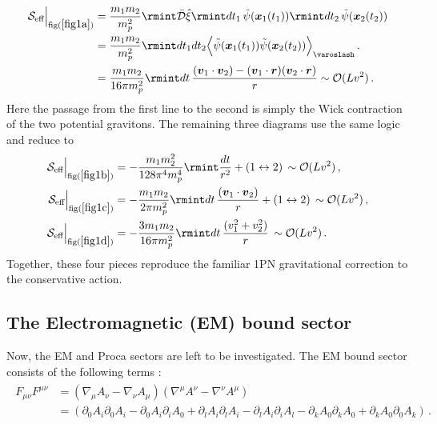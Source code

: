 \begin{align}
    \begin{split}
   \mathcal{S}_{\text{eff}}\Big|_{\text{fig}(\ref{fig1a})}& =\frac{m_1 m_2}{m_p^2}\rmint \Bar{\mathcal{D}}\hat\xi\rmint dt_1\,\tilde{\psi}(\boldsymbol{x}_1
    (t_1))\rmint dt_2\,\tilde{\psi}(\boldsymbol{x}_2(t_2))
  \\ & =\frac{m_1m_2}{m_{p}^2}\rmint dt_1dt_2\Big{\langle}\tilde{\psi}(\boldsymbol{x}_1
    (t_1))\tilde{\psi}(\boldsymbol{x}_2(t_2))\Big{\rangle}_{\varoslash}\,.\\ &
    =\frac{ m_1m_2}{16 \pi m_p^2}\rmint dt\, \frac{(\boldsymbol{v}_1\cdot \boldsymbol{v}_2)-(\boldsymbol{v}_1\cdot \boldsymbol{r})(\boldsymbol{v}_2\cdot \boldsymbol{r})}{r}\sim \mathcal{O}(Lv^2)\,. \label{4.13a}
    \end{split} 
\end{align}
Here the passage from the first line to the second is simply the Wick contraction of the two potential gravitons. The remaining three diagrams use the same logic and reduce to
\begin{align}
    \mathcal{S}_{\text{eff}}\Big|_{\text{fig}(\ref{fig1b})}
    &=-\frac{m_1m_2^2}{128 \pi^4 m_p^4}\rmint \frac{ dt}{r^2}+(1\leftrightarrow 2)\,\sim \mathcal{O}(Lv^2)\,,\\
    \mathcal{S}_{\text{eff}}\Big|_{\text{fig}(\ref{fig1c})}
    &=-\frac{m_1m_2}{2\pi m_p^2}\rmint dt \,\frac{(\boldsymbol{v}_1\cdot \boldsymbol{v}_2)}{r}+(1\leftrightarrow 2)\,\sim \mathcal{O}(Lv^2)\,,\\
    \mathcal{S}_{\text{eff}}\Big|_{\text{fig}(\ref{fig1d})}
    &=-\frac{3  m_1m_2}{16\pi m_p^2}\rmint dt\, \frac{(v_1^2+v_2^2)}{r}\,\sim \mathcal{O}(Lv^2)\,.
\end{align}
Together, these four pieces reproduce the familiar 1PN gravitational correction to the conservative action.
\subsection{The Electromagnetic (EM) bound sector} \label{EM section}
Now, the EM and Proca sectors are left to be investigated. The EM bound sector consists of the following terms :
\begin{align}
    \begin{split}
  F_{\mu\nu}F^{\mu\nu}&=(\nabla_{\mu} A_{\nu}-\nabla_{\nu} A_{\mu})(\nabla^{\mu} A^{\nu}-\nabla^{\nu} A^{\mu})\\ &
=(\partial_0 A_i\partial_0 A_i-\partial_0 A_i\partial_iA_0+\partial_lA_i\partial_l A_i-\partial_l A_i\partial_iA_l-\partial_k A_0\partial_k A_0+\partial_kA_0\partial_0 A_k)\,.
      \end{split}
\end{align}


